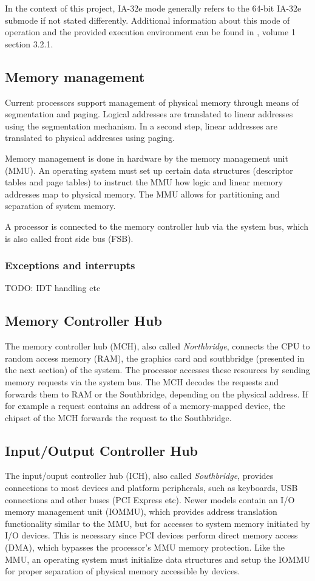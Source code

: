 In the context of this project, IA-32e mode generally refers to the 64-bit
IA-32e submode if not stated differently. Additional information about this mode
of operation and the provided execution environment can be found in
\cite{IntelSDM}, volume 1 section 3.2.1.

\subsection{Memory management}
Current processors support management of physical memory through means of
segmentation and paging. Logical addresses are translated to linear addresses
using the segmentation mechanism. In a second step, linear addresses are
translated to physical addresses using paging.

Memory management is done in hardware by the memory management unit
(MMU).  An operating system must set up certain data structures
(descriptor tables and page tables) to instruct the MMU how logic and linear
memory addresses map to physical memory. The MMU allows for partitioning and
separation of system memory.

A processor is connected to the memory controller hub via the system bus, which
is also called front side bus (FSB).

\subsubsection{Exceptions and interrupts}
TODO: IDT handling etc

\subsection{Memory Controller Hub}
The memory controller hub (MCH), also called
\emph{Northbridge}, connects the CPU to random access memory
(RAM), the graphics card and southbridge (presented in the next section) of the
system. The processor accesses these resources by sending memory requests via
the system bus. The MCH decodes the requests and forwards them to RAM or the
Southbridge, depending on the physical address. If for example a request
contains an address of a memory-mapped device, the chipset of the MCH forwards
the request to the Southbridge.

\subsection{Input/Output Controller Hub}\label{subsec:ich}
The input/ouput controller hub (ICH), also called
\emph{Southbridge}, provides connections to most devices and
platform peripherals, such as keyboards, USB connections and other buses (PCI
Express etc). Newer models contain an I/O memory management unit
(IOMMU), which provides address translation functionality similar
to the MMU, but for accesses to system memory initiated by I/O devices.  This is
necessary since PCI devices perform direct memory access (DMA), which
bypasses the processor's MMU memory protection.  Like the MMU, an operating
system must initialize data structures and setup the IOMMU for proper separation
of physical memory accessible by devices.

